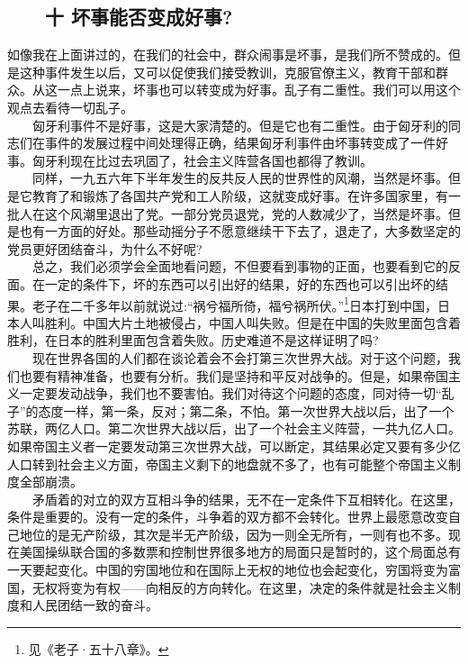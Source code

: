 \documentclass[cn,11pt,chinese]{elegantbook}
\def\myformat#1{\hfil\hfil #1}
\begin{document}
\subsection*{\myformat{　　十 坏事能否变成好事?}}
如像我在上面讲过的，在我们的社会中，群众闹事是坏事，是我们所不赞成的。但是这种事件发生以后，又可以促使我们接受教训，克服官僚主义，教育干部和群众。从这一点上说来，坏事也可以转变成为好事。乱子有二重性。我们可以用这个观点去看待一切乱子。\\
　　匈牙利事件不是好事，这是大家清楚的。但是它也有二重性。由于匈牙利的同志们在事件的发展过程中间处理得正确，结果匈牙利事件由坏事转变成了一件好事。匈牙利现在比过去巩固了，社会主义阵营各国也都得了教训。\\
　　同样，一九五六年下半年发生的反共反人民的世界性的风潮，当然是坏事。但是它教育了和锻炼了各国共产党和工人阶级，这就变成好事。在许多国家里，有一批人在这个风潮里退出了党。一部分党员退党，党的人数减少了，当然是坏事。但是也有一方面的好处。那些动摇分子不愿意继续干下去了，退走了，大多数坚定的党员更好团结奋斗，为什么不好呢?\\
　　总之，我们必须学会全面地看问题，不但要看到事物的正面，也要看到它的反面。在一定的条件下，坏的东西可以引出好的结果，好的东西也可以引出坏的结果。老子在二千多年以前就说过:“祸兮福所倚，福兮祸所伏。”\footnote[3]{ 见《老子·五十八章》。}日本打到中国，日本人叫胜利。中国大片土地被侵占，中国人叫失败。但是在中国的失败里面包含着胜利，在日本的胜利里面包含着失败。历史难道不是这样证明了吗?\\
　　现在世界各国的人们都在谈论着会不会打第三次世界大战。对于这个问题，我们也要有精神准备，也要有分析。我们是坚持和平反对战争的。但是，如果帝国主义一定要发动战争，我们也不要害怕。我们对待这个问题的态度，同对待一切“乱子”的态度一样，第一条，反对；第二条，不怕。第一次世界大战以后，出了一个苏联，两亿人口。第二次世界大战以后，出了一个社会主义阵营，一共九亿人口。如果帝国主义者一定要发动第三次世界大战，可以断定，其结果必定又要有多少亿人口转到社会主义方面，帝国主义剩下的地盘就不多了，也有可能整个帝国主义制度全部崩溃。\\
　　矛盾着的对立的双方互相斗争的结果，无不在一定条件下互相转化。在这里，条件是重要的。没有一定的条件，斗争着的双方都不会转化。世界上最愿意改变自己地位的是无产阶级，其次是半无产阶级，因为一则全无所有，一则有也不多。现在美国操纵联合国的多数票和控制世界很多地方的局面只是暂时的，这个局面总有一天要起变化。中国的穷国地位和在国际上无权的地位也会起变化，穷国将变为富国，无权将变为有权——向相反的方向转化。在这里，决定的条件就是社会主义制度和人民团结一致的奋斗。\\
\end{document}
